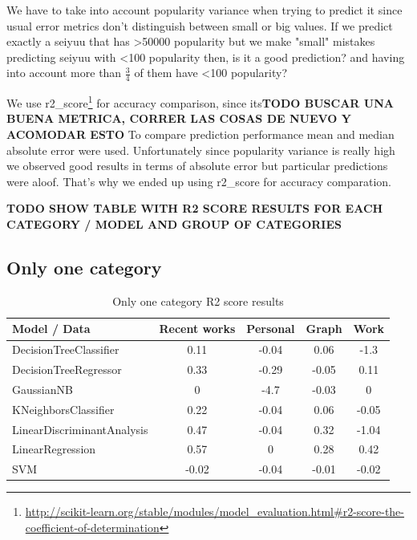 We have to take into account popularity variance when trying to predict it since usual error metrics don't distinguish between small or big values. If we predict exactly a seiyuu that has \textgreater50000 popularity but we make "small" mistakes predicting seiyuu with \textless100 popularity then, is it a good prediction? and having into account more than $\frac{3}{4}$ of them have \textless100 popularity?

We use r2\_score\footnote{\url{http://scikit-learn.org/stable/modules/model_evaluation.html#r2-score-the-coefficient-of-determination}}  for accuracy comparison, since its\textbf{TODO BUSCAR UNA BUENA METRICA, CORRER LAS COSAS DE NUEVO Y ACOMODAR ESTO}
To compare prediction performance mean and median absolute error were used. Unfortunately since popularity variance is really high we observed good results in terms of absolute error but particular predictions were aloof. That's why we ended up using r2\_score for accuracy comparation. 

\textbf{TODO SHOW TABLE WITH R2 SCORE RESULTS FOR EACH CATEGORY / MODEL AND GROUP OF CATEGORIES}

\subsection{Only one category}
\begin{table}[!hbt]
	\begin{center}
	\caption{Only one category R2 score results}
	\label{tab:oneCategory}
	\begin{tabular}{|l|c|c|c|c|}
		\hline
		Model / Data & Recent works & Personal & Graph & Work \\ 
		\hline
		DecisionTreeClassifier & 0.11 & -0.04 & 0.06 & -1.3 \\ 
		\hline
		DecisionTreeRegressor & 0.33 & -0.29 & -0.05 & 0.11 \\ 
		\hline
		GaussianNB & 0 & -4.7 & -0.03 & 0 \\ 
		\hline
		KNeighborsClassifier & 0.22 & -0.04 & 0.06 & -0.05 \\ 
		\hline
		LinearDiscriminantAnalysis & 0.47 & -0.04 & 0.32 & -1.04 \\ 
		\hline
		LinearRegression & 0.57 & 0 & 0.28 & 0.42 \\ 
		\hline
		SVM & -0.02 & -0.04 & -0.01 & -0.02 \\ 
		\hline
	\end{tabular}
	\end{center}
\end{table}

